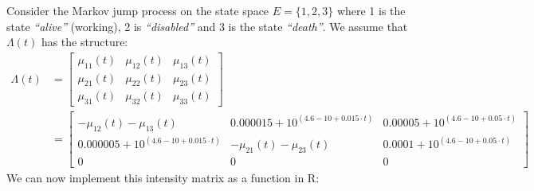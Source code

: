 \documentclass[
]{book}
\begin{document}
Consider the Markov jump process on the state space \(E=\{1,2,3\}\) where 1 is the state \emph{``alive''} (working), 2 is \emph{``disabled''} and 3 is the state \emph{``death''}. We assume that \(\Lambda(t)\) has the structure:
\begin{align*}
\Lambda(t)&=\begin{bmatrix}
\mu_{11}(t) & \mu_{12}(t) & \mu_{13}(t)\\
\mu_{21}(t) & \mu_{22}(t) & \mu_{23}(t)\\
\mu_{31}(t) & \mu_{32}(t) & \mu_{33}(t)
\end{bmatrix}\\
&=
\begin{bmatrix}
-\mu_{12}(t)-\mu_{13}(t) &  0.000015 + 10^{(4.6-10+0.015\cdot t)} & 0.00005 + 10^{(4.6-10+0.05\cdot t)}\\
0.000005 + 10^{(4.6-10+0.015\cdot t)} & -\mu_{21}(t)-\mu_{23}(t) & 0.0001 + 10^{(4.6-10+0.05\cdot t)}\\
0 & 0 & 0
\end{bmatrix}
\end{align*}
We can now implement this intensity matrix as a function in R:
\end{document}
